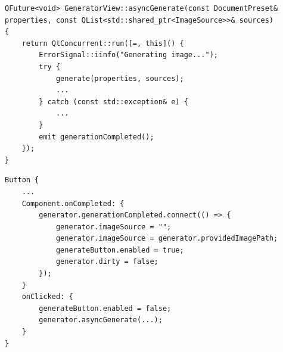 \newpage
\begin{listing}[!h]
    \caption{Kép generálása külön szálon.}
    \label{lst:async}
    \begin{verbatim}
QFuture<void> GeneratorView::asyncGenerate(const DocumentPreset& properties, const QList<std::shared_ptr<ImageSource>>& sources) 
{
    return QtConcurrent::run([=, this]() {
        ErrorSignal::iinfo("Generating image...");
        try {
            generate(properties, sources);
            ...
        } catch (const std::exception& e) {
            ...
        }
        emit generationCompleted();
    });
}
    \end{verbatim}
\end{listing}

\begin{listing}[!h]
    \caption{Jelzésre feliratkozás QML-ből.}
    \label{lst:connect}
    \begin{verbatim}
Button {
    ...
    Component.onCompleted: {
        generator.generationCompleted.connect(() => {
            generator.imageSource = "";
            generator.imageSource = generator.providedImagePath;
            generateButton.enabled = true;
            generator.dirty = false;
        });
    }
    onClicked: {
        generateButton.enabled = false;
        generator.asyncGenerate(...);
    }
}
    \end{verbatim}
\end{listing}

